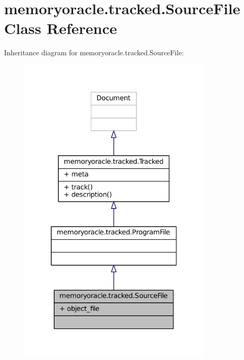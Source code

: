 \hypertarget{classmemoryoracle_1_1tracked_1_1SourceFile}{}\section{memoryoracle.\+tracked.\+Source\+File Class Reference}
\label{classmemoryoracle_1_1tracked_1_1SourceFile}


Inheritance diagram for memoryoracle.\+tracked.\+Source\+File\+:
\nopagebreak
\begin{figure}[H]
\begin{center}
\leavevmode
\includegraphics[width=265pt]{classmemoryoracle_1_1tracked_1_1SourceFile__inherit__graph}
\end{center}
\end{figure}


